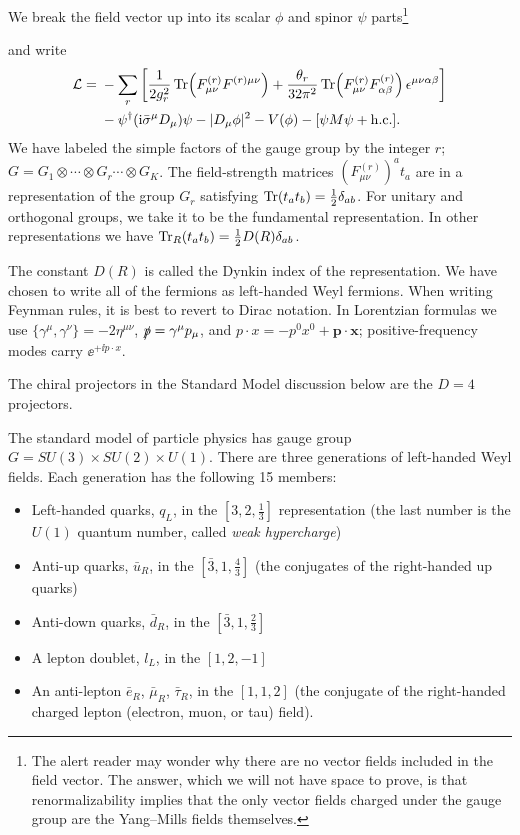 We break the field vector up into its scalar $\phi$ and spinor $\psi$ parts\footnote[1]{The
alert reader may wonder why there are no vector fields included in the field
vector. The answer, which we will not have space to prove, is that
renormalizability implies that the only vector fields charged under the gauge
group are the Yang--Mills fields themselves.}


and write
\begin{equation*}
\begin{split}
  \mathcal L={}&-\sum_r\left[\frac{1}{2g_r^2}
  \operatorname{Tr}\!\left(F_{\mu\nu}^{(r)}F^{(r)\mu\nu}\right)
  +\frac{\theta_r}{32\pi^2}
  \operatorname{Tr}\!\left(F_{\mu\nu}^{(r)}F_{\alpha\beta}^{(r)}\right)
  \epsilon^{\mu\nu\alpha\beta}\right]\\
  &-\psi^\dagger(\mathrm{i}\bar\sigma^\mu D_\mu)\psi-|D_\mu\phi|^2-V(\phi)
  -[\psi M\psi+\mathrm{h.c.}].
\end{split}
\end{equation*}
We have labeled the simple factors of the gauge group by the integer $r$;
$G=G_1\otimes\cdots\otimes G_r\cdots\otimes G_K$. The field-strength
matrices $(F_{\mu\nu}^{(r)})^a t_a$ are in a representation of the group
$G_r$ satisfying $\operatorname{Tr}(t_at_b)=\frac12\delta_{ab}$. For unitary and orthogonal
groups, we take it to be the fundamental representation. In other
representations we have
$\operatorname{Tr}_R(t_at_b)=\frac12D(R)\delta_{ab}$.

The constant $D(R)$ is called the Dynkin index of the representation. We have
chosen to write all of the fermions as left-handed Weyl fermions. When writing
Feynman rules, it is best to revert to Dirac notation. In Lorentzian formulas
we use $\{\gamma^\mu,\gamma^\nu\}=-2\eta^{\mu\nu}$,
$\slashed p=\gamma^\mu p_\mu$, and $p\cdot x=-p^0x^0+\mathbf p\cdot\mathbf x$;
positive-frequency modes carry $\ee^{+\ii p\cdot x}$.

The chiral projectors in the Standard Model discussion below are the
$D=4$ projectors.

The standard model of particle physics has gauge group
$G=SU(3)\times SU(2)\times U(1)$. There are three generations of left-handed
Weyl fields. Each generation has the following 15 members:
\begin{itemize}[leftmargin=2em]
\item Left-handed quarks, $q_L$, in the $[3,2,\frac13]$ representation (the
last number is the $U(1)$ quantum number, called \emph{weak hypercharge})
\item Anti-up quarks, $\bar u_R$, in the $[\bar3,1,\frac43]$ (the conjugates of
the right-handed up quarks)
\item Anti-down quarks, $\bar d_R$, in the $[\bar3,1,\frac23]$
\item A lepton doublet, $l_L$, in the $[1,2,-1]$
\item An anti-lepton $\bar e_R$, $\bar\mu_R$, $\bar\tau_R$, in the
$[1,1,2]$ (the conjugate of the right-handed charged lepton (electron, muon, or
tau) field).
\end{itemize}

